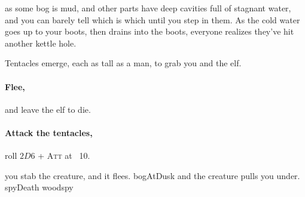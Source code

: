 as some bog is mud, and other parts have deep cavities full of stagnant water, and you can barely tell which is which until you step in them.
As the cold water goes up to your boots, then drains into the boots, everyone realizes they've hit another kettle hole.

Tentacles emerge, each as tall as a man, to grab you and the elf.

\paragraph{Flee,}
and leave the elf to die.

\paragraph{Attack the tentacles,}
roll $2D6$ + {\scshape Att} at ~10.

\begin{selectPath}
  {you stab the creature, and it flees.}%
  {bogAtDusk}
  {and the creature pulls you under.}%
  {spyDeath} \gls{woodspy}
\end{selectPath}
